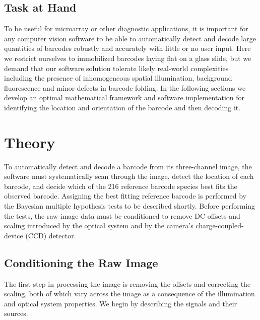 \subsection{Task at Hand}
To be useful for microarray or other diagnostic applications, it is important for any computer vision software to be able to automatically detect and decode large quantities of barcodes robustly and accurately with little or no user input. 
Here we restrict ourselves to immobilized barcodes laying flat on a glass slide, but we demand that our software solution tolerate likely real-world complexities including the presence of inhomogeneous spatial illumination, background fluorescence and minor defects in barcode folding.  
In the following sections we develop an optimal mathematical framework and software implementation for identifying the location and orientation of the barcode and then decoding it.


\section{Theory}
To automatically detect and decode a barcode from its three-channel image, the software must systematically scan through the image, detect the location of each barcode, and decide which of the 216 reference barcode species best fits the observed barcode. Assigning the best fitting reference barcode is performed by the Bayesian multiple hypothesis tests to be described shortly. Before performing the tests, the raw image data must be conditioned to remove DC offsets and scaling introduced by the optical system and by the camera's charge-coupled-device (CCD) detector.


\subsection{Conditioning the Raw Image}
The first step in processing the image is removing the offsets and correcting the scaling, both of which vary across the image as a consequence of the illumination and optical system properties. We begin by describing the signals and their sources.


